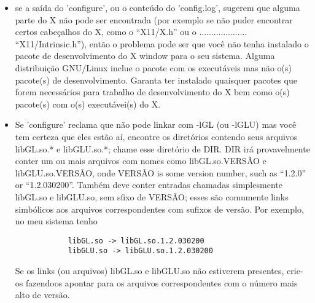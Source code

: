 \documentclass[12pt,a4paper]{article}
\begin{document}
\begin{itemize}
\begin{itemize}
              \item O arquivo 'config.log' queno 'configure' escreve enquanto \'e executado. Esse
                arquivo cont\'em todos os detalhes terr\'ivies sobre os testes que
                'configure' est\'a fazendo. O 'config.log' ir\'a ter mensagens de erro que podem
                indicar por que certos testes falham. IMPORTANTE nota sobre a leitura do
                'config.log': muitos dos testes do configure envolvem la\c{c}os que tentam
                muitas possibilidades --- por exemplo muitas localiza\c{c}\~oes poss\'iveis
                para um arquivo de cabe\c{c}alho. O 'configure' ir\'a escrever um pequeno programa e
                tentar compl\'a-lo uma vez para cada uma dessas localiza\c{c}\~oes, at\'e enconrar
                encontrar uma que trabalhe. Paa cada uma que n\~ao funcionou, ir\~ao existir
                mensagens de erro no arquivo 'config.log'. Quando for ler o
                'config.log', garanta olhar para todos esses testes, n\~ao apenas o
                primeiro deles, durante a tentativa de decidor por que um teste est\'a falhando.
             \end{itemize}
          \item se a sa\'ida do 'configure', ou o conte\'udo do 'config.log',
            sugerem que alguma parte do X n\~ao pode ser encontrada (por exemplo se n\~ao puder
            encontrar certos cabe\c{c}alhos do X, como o ``X11/X.h'' ou o ....................\\``X11/Intrinsic.h''),
            ent\~ao o problema pode ser que voc\^e n\~ao tenha instalado o pacote
            de desenvolvimento do X window para o seu sistema. Alguma distribui\c{c}\~ao
            GNU/Linux inclue o pacote com os execut\'aveis mas n\~ao o(s) pacote(s) de
            desenvolvimento. Garanta ter instalado quaisquer pacotes que forem
            necess\'arios para trabalho de desenvolvimento do X bem como o(s) pacote(s) com o(s) execut\'avei(s) do X.

          \item Se 'configure' reclama que n\~ao pode linkar com -lGL (ou -lGLU) mas
            voc\^e tem certeza que eles est\~ao a\'i, encontre os diret\'{o}rios contendo seus
            arquivos libGL.so.* e libGLU.so.*; chame esse diret\'{o}rio de DIR. DIR ir\'a
            provavelmente conter um ou mais arquivos com nomes como libGL.so.VERS\~AO
            e libGLU.so.VERS\~AO, onde VERS\~AO is some version number,
            such as ``1.2.0'' or ``1.2.030200''. Tamb\'em deve conter entradas
            chamadas simplesmente libGL.so e libGLU.so, sem sfixo de VERS\~AO; esses
            s\~ao comumente links simb\'{o}licos aos arquivos correspondentes com sufixos de
            vers\~ao. Por exemplo, no meu sistema tenho
	    \begin{verbatim}
            libGL.so -> libGL.so.1.2.030200
            libGLU.so -> libGLU.so.1.2.030200
	    \end{verbatim}
            Se os links (ou arquivos) libGL.so e libGLU.so n\~ao estiverem presentes,
            crie-os fazendoos apontar para os arquivos correspondentes com
            o n\'umero mais alto de vers\~ao.


\end{itemize}
\end{document}
